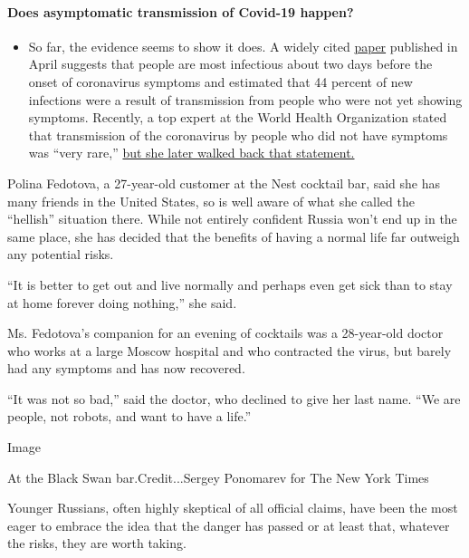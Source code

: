 \begin{itemize}
{  \paragraph{Does asymptomatic transmission of Covid-19
  happen?}\label{does-asymptomatic-transmission-of-covid-19-happen}}

  \begin{itemize}
  \tightlist
  \item
    So far, the evidence seems to show it does. A widely cited
    \href{https://www.nature.com/articles/s41591-020-0869-5}{paper}
    published in April suggests that people are most infectious about
    two days before the onset of coronavirus symptoms and estimated that
    44 percent of new infections were a result of transmission from
    people who were not yet showing symptoms. Recently, a top expert at
    the World Health Organization stated that transmission of the
    coronavirus by people who did not have symptoms was ``very rare,''
    \href{https://www.nytimes.com/2020/06/09/world/coronavirus-updates.html?action=click\&pgtype=Article\&state=default\&region=MAIN_CONTENT_3\&context=storylines_faq\#link-1f302e21}{but
    she later walked back that statement.}
  \end{itemize}
\end{itemize}

Polina Fedotova, a 27-year-old customer at the Nest cocktail bar, said
she has many friends in the United States, so is well aware of what she
called the ``hellish'' situation there. While not entirely confident
Russia won't end up in the same place, she has decided that the benefits
of having a normal life far outweigh any potential risks.

``It is better to get out and live normally and perhaps even get sick
than to stay at home forever doing nothing,'' she said.

Ms. Fedotova's companion for an evening of cocktails was a 28-year-old
doctor who works at a large Moscow hospital and who contracted the
virus, but barely had any symptoms and has now recovered.

``It was not so bad,'' said the doctor, who declined to give her last
name. ``We are people, not robots, and want to have a life.''

Image

At the Black Swan bar.Credit...Sergey Ponomarev for The New York Times

Younger Russians, often highly skeptical of all official claims, have
been the most eager to embrace the idea that the danger has passed or at
least that, whatever the risks, they are worth taking.

